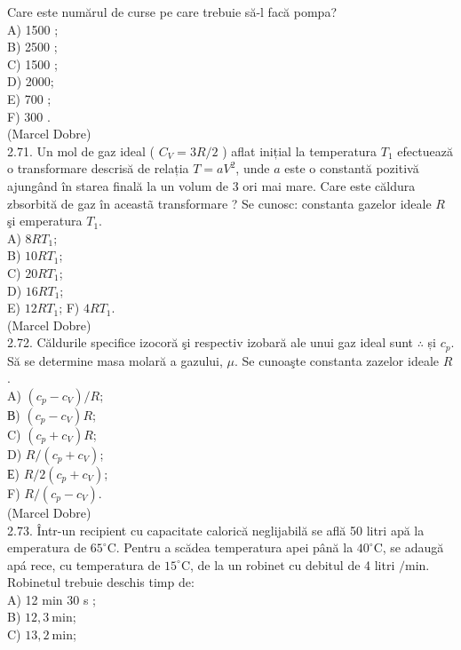 Care este numărul de curse pe care trebuie să-l facă pompa?\\
A) 1500 ;\\
B) 2500 ;\\
C) 1500 ;\\
D) 2000;\\
E) 700 ;\\
F) 300 .\\
(Marcel Dobre)\\
2.71. Un mol de gaz ideal ( $C_{V}=3 R / 2$ ) aflat inițial la temperatura $T_{1}$ efectuează o transformare descrisă de relația $T=a V^{2}$, unde $a$ este o constantă pozitivă ajungând în starea finală la un volum de 3 ori mai mare. Care este căldura\\
zbsorbită de gaz în aceastã transformare ? Se cunosc: constanta gazelor ideale $R$ şi emperatura $T_{1}$.\\
A) $8 R T_{1}$;\\
B) $10 R T_{1}$;\\
C) $20 R T_{1}$;\\
D) $16 R T_{1}$;\\
E) $12 R T_{1}$; F) $4 R T_{1}$.\\
(Marcel Dobre)\\
2.72. Căldurile specifice izocoră şi respectiv izobară ale unui gaz ideal sunt $\therefore$ și $c_{p}$. Să se determine masa molară a gazului, $\mu$. Se cunoaşte constanta zazelor ideale $R$.\\
A) $\left(c_{p}-c_{V}\right) / R$;\\
В) $\left(c_{p}-c_{V}\right) R$;\\
C) $\left(c_{p}+c_{V}\right) R$;\\
D) $R /\left(c_{p}+c_{V}\right)$;\\
Е) $R / 2\left(c_{p}+c_{V}\right)$;\\
F) $R /\left(c_{p}-c_{V}\right)$.\\
(Marcel Dobre)\\
2.73. Într-un recipient cu capacitate calorică neglijabilă se află 50 litri apă la emperatura de $65^{\circ} \mathrm{C}$. Pentru a scădea temperatura apei până la $40^{\circ} \mathrm{C}$, se adaugă apá rece, cu temperatura de $15^{\circ} \mathrm{C}$, de la un robinet cu debitul de 4 litri $/ \mathrm{min}$. Robinetul trebuie deschis timp de:\\
A) 12 min 30 s ;\\
B) $12,3 \mathrm{~min}$;\\
C) $13,2 \mathrm{~min}$;\\
